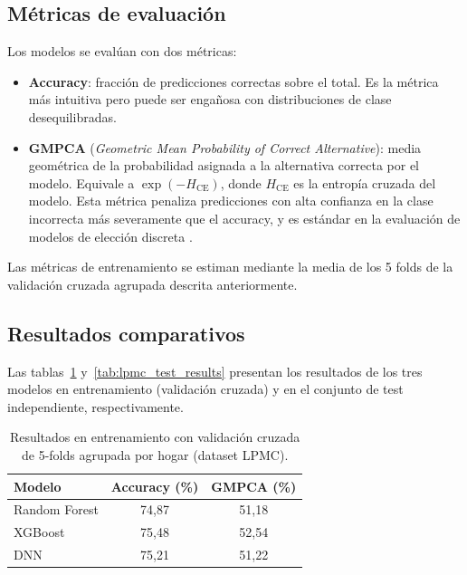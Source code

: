 \subsection{Métricas de evaluación}

Los modelos se evalúan con dos métricas:

\begin{itemize}
  \item \textbf{Accuracy}: fracción de predicciones correctas sobre el total. Es la métrica más intuitiva pero puede ser engañosa con distribuciones de clase desequilibradas.
  \item \textbf{GMPCA} (\textit{Geometric Mean Probability of Correct Alternative}): media geométrica de la probabilidad asignada a la alternativa correcta por el modelo. Equivale a \(\exp(-H_{\text{CE}})\), donde $H_{\text{CE}}$ es la entropía cruzada del modelo. Esta métrica penaliza predicciones con alta confianza en la clase incorrecta más severamente que el accuracy, y es estándar en la evaluación de modelos de elección discreta \cite{MartinBaos2023Thesis,MartinBaos2023TRC}.
\end{itemize}

Las métricas de entrenamiento se estiman mediante la media de los 5 folds de la validación cruzada agrupada descrita anteriormente.

\subsection{Resultados comparativos}

Las tablas~\ref{tab:lpmc_train_results} y~\ref{tab:lpmc_test_results} presentan los resultados de los tres modelos en entrenamiento (validación cruzada) y en el conjunto de test independiente, respectivamente.

\begin{table}[htbp]
  \caption{Resultados en entrenamiento con validación cruzada de 5-folds agrupada por hogar (dataset LPMC).}
  \label{tab:lpmc_train_results}
  \centering
  \begin{tabular}{lcc}
    \toprule
    \textbf{Modelo} & \textbf{Accuracy (\%)} & \textbf{GMPCA (\%)} \\
    \midrule
    Random Forest & 74,87 & 51,18 \\
    XGBoost       & 75,48 & 52,54 \\
    DNN           & 75,21 & 51,22 \\
    \bottomrule
  \end{tabular}
\end{table}

